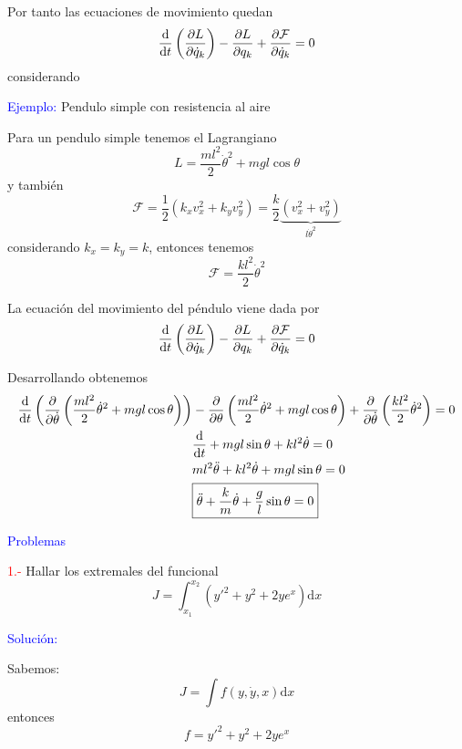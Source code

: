 \documentclass[../main]{subfiles}
\begin{document}
Por tanto las ecuaciones de movimiento quedan
\begin{equation}
    \dv{}{t}\left(\pdv{L}{\dot{q}_k}\right)-\pdv{L}{q_k}+\pdv{\mathcal{F}}{\dot{q}_k}=0
\end{equation}
considerando 

\textcolor{blue}{Ejemplo:} Pendulo simple con resistencia al aire

Para un pendulo simple tenemos el Lagrangiano
\begin{equation*}
    L=\dfrac{ml^2}{2}\dot{\theta}^2+mgl\cos \theta
\end{equation*}
y también
\begin{equation*}
    \mathcal{F}=\dfrac{1}{2}(k_xv^2_x+k_yv^2_y)=\dfrac{k}{2}\underbrace{(v^2_x+v^2_y)}_{l\dot{\theta}^2}
\end{equation*}
considerando $k_x=k_y=k$, entonces tenemos
\begin{equation*}
    \mathcal{F}=\dfrac{kl^2}{2}\dot{\theta}^2
\end{equation*}

La ecuación del movimiento del péndulo viene dada por
\begin{equation*}
    \dv{}{t}\left(\pdv{L}{\dot{q}_k}\right)-\pdv{L}{q_k}+\pdv{\mathcal{F}}{\dot{q}_k}=0
\end{equation*}

Desarrollando obtenemos
\begin{align*}
    \dv{}{t}\left(\pdv{}{\dot{\theta}}\left(\dfrac{ml^2}{2}\dot{\theta}^2+mgl\cos \theta\right)\right)&-\pdv{}{\theta}\left(\dfrac{ml^2}{2}\dot{\theta}^2+mgl\cos \theta\right)+\pdv{}{\dot{\theta}}\left(\dfrac{kl^2}{2}\dot{\theta}^2\right)=0\\
    &\dv{}{t}(ml^2\dot{\theta})+mgl\sin \theta+kl^2\dot{\theta}=0\\
    &ml^2\ddot{\theta}+kl^2\dot{\theta}+mgl\sin \theta=0\\
    &\boxed{\ddot{\theta}+\dfrac{k}{m}\dot{\theta}+\dfrac{g}{l}\sin \theta=0}
\end{align*}

\textcolor{blue}{Problemas}

\textcolor{red}{1.-} Hallar los extremales del funcional
\begin{equation*}
    J=\int_{x_1}^{x_2}(y'^2+y^2+2ye^x)\mathrm{d}x
\end{equation*}

\textcolor{blue}{Solución:}

Sabemos:
\begin{equation*}
    J=\int f(y, \dot{y}, x)\mathrm{d}x
\end{equation*}
entonces
\begin{equation*}
    f=y'^2+y^2+2ye^x
\end{equation*}
\end{document}
